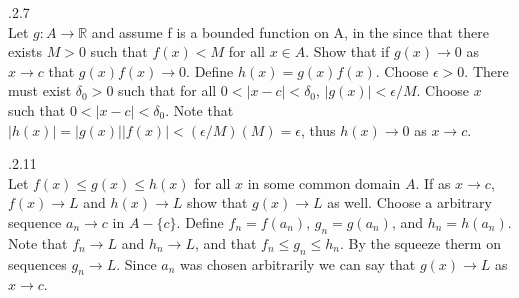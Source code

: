 \documentclass[12pt]{article}
\makeatletter
\theoremstyle{homework}
\newenvironment{exercise}[1]
{\def\@currentlabel{#1}\exercisecore}
{\endexercisecore}
\makeatother
\begin{document}
\begin{exercise}

4.2.7 \\
Let $g:A\rightarrow\mathbb{R}$ and assume f is a bounded function on A, in the since that there exists $M>0$ such that $f(x)<M$ for all $x\in A$.  Show that if $g(x)\rightarrow 0$ as $x\rightarrow c$ that $g(x)f(x)\rightarrow 0$.
\end{exercise}
Define $h(x)=g(x)f(x)$.  Choose $\epsilon>0$.  There must exist $\delta_0>0$ such that for all $0<|x-c|<\delta_0$, $|g(x)|<\epsilon/M$.  Choose $x$ such that $0<|x-c|<\delta_0$.  Note that $|h(x)|=|g(x)||f(x)|<(\epsilon/M)(M)=\epsilon$, thus $h(x)\rightarrow 0$ as $x\rightarrow c$.

\begin{exercise}

4.2.11 \\
Let $f(x)\leq g(x) \leq h(x)$ for all $x$ in some common domain $A$.  If as $x\rightarrow c$, $f(x)\rightarrow L$ and $h(x)\rightarrow L$ show that $g(x)\rightarrow L$ as well.
\end{exercise}
Choose a arbitrary sequence $a_n\rightarrow c$ in $A-\{c\}$.  Define $f_n=f(a_n)$, $g_n=g(a_n)$, and $h_n=h(a_n)$.  Note that $f_n\rightarrow L$ and $h_n\rightarrow L$, and that $f_n\leq g_n\leq h_n$.  By the squeeze therm on sequences $g_n\rightarrow L$.  Since $a_n$ was chosen arbitrarily we can say that $g(x)\rightarrow L$ as $x\rightarrow c$.
\end{document}
